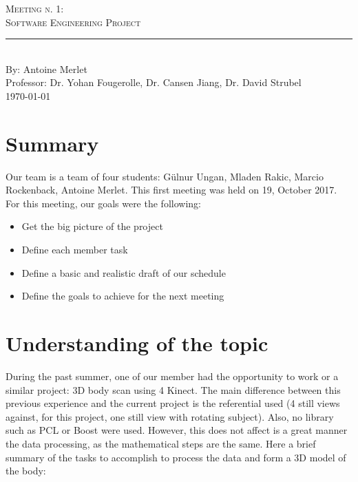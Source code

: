 \documentclass[aps,letterpaper,11pt]{revtex4}
\newcommand{\labno}{Meeting n. 1}
\newcommand{\labtitle}{Software Engineering Project}
\newcommand{\authorname}{Antoine Merlet}
\newcommand{\professor}{Dr. Yohan Fougerolle, Dr. Cansen Jiang, Dr. David Strubel}
\begin{document}
  
\begin{titlepage}
\begin{center}
{\LARGE \textsc{\labno:} \\ \vspace{4pt}}
{\Large \textsc{\labtitle} \\ \vspace{4pt}} 
\rule[13pt]{\textwidth}{1pt} \\ \vspace{150pt}
{\large By: \authorname \\ \vspace{10pt}
Professor: \professor \\ \vspace{10pt}
\today}
\end{center}




\end{titlepage}%
\newpage

\section{Summary}
Our team is a team of four students: Gülnur Ungan, Mladen Rakic, Marcio Rockenback, Antoine Merlet.
This first meeting was held on 19, October 2017. 
For this meeting, our goals were the following:

\begin{itemize}
\item Get the big picture of the project
\item Define each member task
\item Define a basic and realistic draft of our schedule
\item Define the goals to achieve for the next meeting
\end{itemize}

\section{Understanding of the topic}
During the past summer, one of our member had the opportunity to work or a similar project: 3D body scan using 4 Kinect. The main difference between this previous experience and the current project is the referential used (4 still views against, for this project, one still view with rotating subject). Also, no library such as PCL or Boost were used. However, this does not affect is a great manner the data processing, as the mathematical steps are the same. Here a brief summary of the tasks to accomplish to process the data and form a 3D model of the body:
\end{document}

